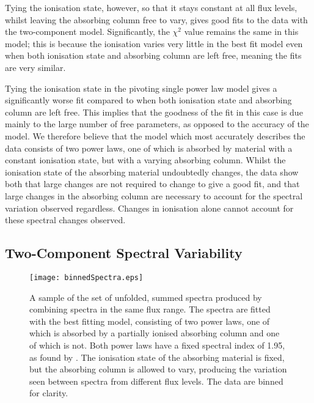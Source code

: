 \documentclass[useAMS,usenatbib]{sam}
\begin{document}
Tying the ionisation state, however, so that it stays constant at all flux levels, whilst leaving the absorbing column free to vary, gives good fits to the data with the
two-component model. Significantly, the $\chi^2$ value remains the same in this model; this is because the ionisation varies very little in the best fit model even when
both ionisation state and absorbing column are left free, meaning the fits are very similar. 

Tying the ionisation state in the pivoting single power law model gives a significantly worse fit compared to when both ionisation state and absorbing column are left
free. This implies that the goodness of the fit in this case is due mainly to the large number of free parameters, as opposed to the accuracy of the model. We therefore
believe that the model which most accurately describes the data consists of two power laws, one of which is absorbed by material with a constant ionisation state, but
with a varying absorbing column. Whilst the ionisation state of the absorbing material undoubtedly changes, the data show both that large changes are not required to
change to give a good fit, and that large changes in the absorbing column are necessary to account for the spectral variation observed regardless. Changes in ionisation
alone cannot account for these spectral changes observed.



\subsection{Two-Component Spectral Variability}

\begin{figure}
	\texttt{[image: binnedSpectra.eps]}
	\caption{A sample of the set of unfolded, summed spectra produced by combining spectra in the same flux range. The spectra are fitted with the best fitting model,
	consisting of two power laws, one of which is absorbed by a partially ionised absorbing column and one of which is not. Both power laws have a fixed spectral
index of 1.95, as found by \citet{risaliti13}. The ionisation state of the absorbing material is fixed, but the absorbing column is allowed to vary, producing the
variation seen between spectra from different flux levels. The data are binned for clarity.}
	\label{spectra}
\end{figure} 
\end{document}
